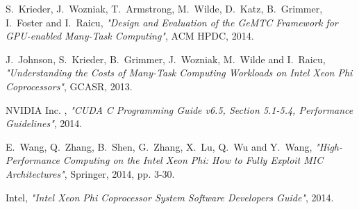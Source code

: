 \documentclass[10pt, conference, compsocconf]{IEEEtran}
\begin{document}
%
%
%
\begin{thebibliography}{1}

S.~Krieder, J.~Wozniak, T.~Armstrong, M.~Wilde, D.~Katz, B.~Grimmer,
I.~Foster and I.~Raicu, \emph{"Design and Evaluation of the GeMTC
Framework for GPU-enabled Many-Task Computing"}, ACM HPDC, 2014.

J.~Johnson, S.~Krieder, B.~Grimmer, J.~Wozniak, M.~Wilde and I.~Raicu,
\emph{"Understanding the Costs of Many-Task Computing Workloads
on Intel Xeon Phi Coprocessors"}, GCASR, 2013.

NVIDIA Inc. , \emph{"CUDA C Programming Guide v6.5, Section 5.1-5.4,
Performance Guidelines"}, 2014.

E.~Wang, Q.~Zhang, B.~Shen, G.~Zhang, X.~Lu, Q.~Wu and Y.~Wang,
\emph{"High-Performance Computing on the Intel Xeon Phi: How to
Fully Exploit MIC Architectures"}, Springer, 2014, pp. 3-30.

Intel,
\emph{"Intel Xeon Phi Coprocessor System Software Developers Guide"},
2014.

\end{thebibliography}




\end{document}
